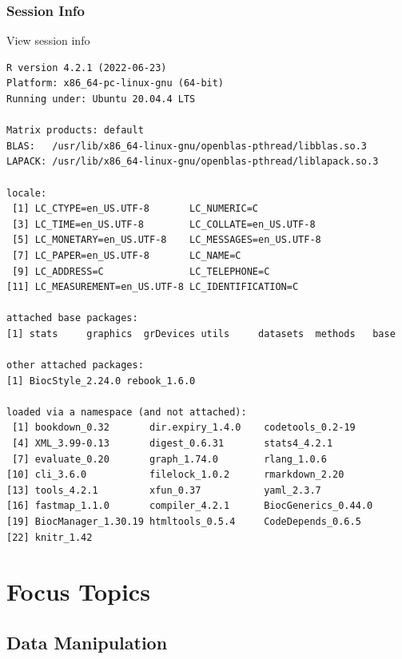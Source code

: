 \documentclass[
]{book}
\begin{document}
\hypertarget{session-info-1}{%
\section*{Session Info}\label{session-info-1}}

View session info

\begin{verbatim}
R version 4.2.1 (2022-06-23)
Platform: x86_64-pc-linux-gnu (64-bit)
Running under: Ubuntu 20.04.4 LTS

Matrix products: default
BLAS:   /usr/lib/x86_64-linux-gnu/openblas-pthread/libblas.so.3
LAPACK: /usr/lib/x86_64-linux-gnu/openblas-pthread/liblapack.so.3

locale:
 [1] LC_CTYPE=en_US.UTF-8       LC_NUMERIC=C              
 [3] LC_TIME=en_US.UTF-8        LC_COLLATE=en_US.UTF-8    
 [5] LC_MONETARY=en_US.UTF-8    LC_MESSAGES=en_US.UTF-8   
 [7] LC_PAPER=en_US.UTF-8       LC_NAME=C                 
 [9] LC_ADDRESS=C               LC_TELEPHONE=C            
[11] LC_MEASUREMENT=en_US.UTF-8 LC_IDENTIFICATION=C       

attached base packages:
[1] stats     graphics  grDevices utils     datasets  methods   base     

other attached packages:
[1] BiocStyle_2.24.0 rebook_1.6.0    

loaded via a namespace (and not attached):
 [1] bookdown_0.32       dir.expiry_1.4.0    codetools_0.2-19   
 [4] XML_3.99-0.13       digest_0.6.31       stats4_4.2.1       
 [7] evaluate_0.20       graph_1.74.0        rlang_1.0.6        
[10] cli_3.6.0           filelock_1.0.2      rmarkdown_2.20     
[13] tools_4.2.1         xfun_0.37           yaml_2.3.7         
[16] fastmap_1.1.0       compiler_4.2.1      BiocGenerics_0.44.0
[19] BiocManager_1.30.19 htmltools_0.5.4     CodeDepends_0.6.5  
[22] knitr_1.42         
\end{verbatim}

\hypertarget{part-focus-topics}{%
\part{Focus Topics}\label{part-focus-topics}}

\hypertarget{datamanipulation}{%
\chapter{Data Manipulation}\label{datamanipulation}}
\end{document}
